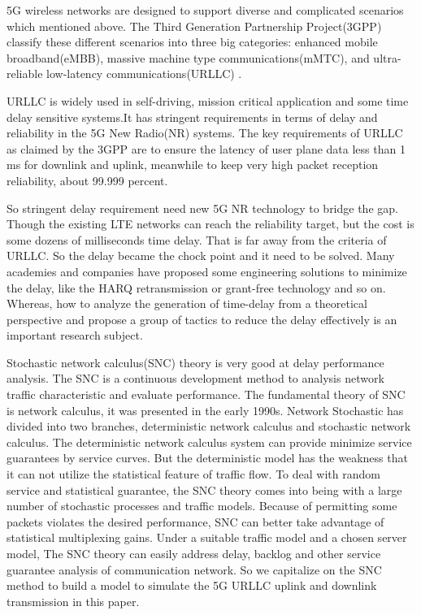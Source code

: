 \documentclass[conference]{IEEEtran}
\begin{document}
5G wireless networks are designed to support diverse and complicated scenarios which mentioned above.
The Third Generation Partnership Project(3GPP) classify these different scenarios into three big categories: enhanced mobile broadband(eMBB), massive machine type communications(mMTC), and ultra-reliable low-latency communications(URLLC) \cite{b2}.

URLLC is widely used in self-driving, mission critical application and some time delay sensitive systems.It has stringent requirements in terms of delay and reliability in the 5G New Radio(NR) systems. The key requirements of URLLC as claimed by the 3GPP are to ensure the latency of user plane data less than 1 ms for downlink and uplink, meanwhile to keep very high packet reception reliability, about 99.999 percent.\cite{b3}

So stringent delay requirement need new 5G NR technology to bridge the gap. Though the existing LTE networks can reach the reliability target, but the cost is some dozens of milliseconds time delay. That is far away from the criteria of URLLC. So the delay became the chock point and it need to be solved. Many academies and companies have proposed some engineering solutions to minimize the delay, like the HARQ retransmission or grant-free technology and so on. Whereas, how to analyze the generation of time-delay from a theoretical perspective and propose a group of tactics to reduce the delay effectively is an important research subject.

Stochastic network calculus(SNC) theory is very good at delay performance analysis. The SNC is a continuous development method to analysis network traffic characteristic and evaluate performance. The fundamental theory of SNC is network calculus, it was presented in the early 1990s. Network Stochastic has divided into two branches, deterministic network calculus and stochastic network calculus\cite{b4}. The deterministic network calculus system can provide minimize service guarantees by service curves\cite{b5}. But the deterministic model has the weakness that it can not utilize the statistical feature of traffic flow. To deal with random service and statistical guarantee, the SNC theory comes into being with a large number of stochastic processes and traffic models. Because of permitting some packets violates the desired performance, SNC can better take advantage of statistical multiplexing gains. Under a suitable traffic model and a chosen server model, The SNC theory can easily address delay, backlog and other service guarantee analysis of communication network. So we capitalize on the SNC method to build a model to simulate the 5G URLLC uplink and downlink transmission in this paper.
\end{document}
